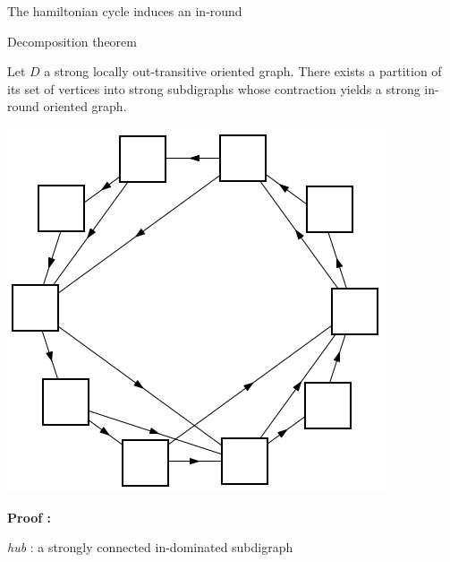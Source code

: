 \documentclass{beamer}
\begin{document}
\begin{frame}{The hamiltonian cycle induces an in-round}
\end{frame}

\begin{frame}{Decomposition theorem}

\begin{theorem}
Let $D$ a strong locally out-transitive oriented graph. There exists a partition of its set of vertices into strong subdigraphs whose contraction yields a strong in-round oriented graph.
\end{theorem}

 {
\centering

\includegraphics[scale=0.4]{Images/decomposition.png}
}

 {
\textbf{Proof :}

\begin{definition}
\emph{hub} : a strongly connected in-dominated subdigraph
\end{definition}
}

\end{frame}
\end{document}
